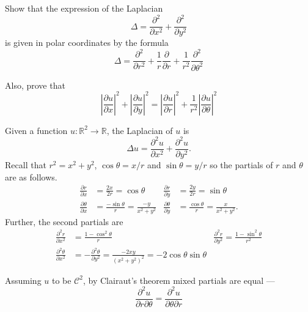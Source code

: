 \documentclass[12 pt, letterpaper]{hmcpset}
\begin{document}
\begin{problem}[S \& S \S 1.4 \#10.]
	Show that the expression of the Laplacian
	\[
		\Delta = \frac{\partial^{2}}{\partial x^{2}} + \frac{\partial^{2}}{\partial y^{2}}
	\]
	is given in polar coordinates by the formula
	\[
		\Delta = \frac{\partial^{2}}{\partial r^{2}} + \frac{1}{r} \frac{\partial }{\partial r} + \frac{1}{r^{2}} \frac{\partial^{2}}{\partial \theta^{2}}
	\]

	Also, prove that
	\[
		\left \lvert \frac{\partial u}{\partial x} \right \rvert^{2} + \left \lvert \frac{\partial u}{\partial y} \right \rvert^{2} = \left \lvert \frac{\partial u}{\partial r} \right \rvert^{2} + \frac{1}{r^{2}} \left \lvert \frac{\partial u}{\partial \theta} \right \rvert^{2}
	\]
\end{problem}

\begin{solution}
	Given a function $u : \mathbb{R}^{2} \to \mathbb{R}$, the Laplacian of $u$ is
	\[
		\Delta u = \frac{\partial^{2} u}{\partial x^{2}} + \frac{\partial^{2} u}{\partial y^{2}}.
	\]
	Recall that $r^{2} = x^{2} + y^{2}$, $\cos{\theta} = x / r$ and $\sin{\theta} = y / r$ so the partials of $r$ and $\theta$ are as follows.
	\begin{align*}
		\frac{\partial r}{\partial x} & = \frac{2x}{2r} = \cos{\theta} & \frac{\partial r}{\partial y} & = \frac{2y}{2r} = \sin{\theta} \\
		\frac{\partial \theta}{\partial x} & = \frac{-\sin{\theta}}{r} = \frac{-y}{x^{2} + y^{2}} & \frac{\partial \theta}{\partial y} & = \frac{\cos{\theta}}{r} = \frac{x}{x^{2} + y^{2}}.
	\end{align*}
	Further, the second partials are
	\begin{align*}
		\frac{\partial^{2} r}{\partial x^{2}} & = \frac{1 - \cos^{2}{\theta}}{r} & \frac{\partial^{2} r}{\partial y^{2}} = \frac{1 - \sin^{2}{\theta}}{r^{2}} \\
		\frac{\partial^{2} \theta}{\partial x^{2}} & = - \frac{\partial^{2} \theta}{\partial y^{2}} = \frac{-2 x y}{(x^{2} + y^{2})^{2}} = -2 \cos{\theta} \sin{\theta}
	\end{align*}

	Assuming $u$ to be $\mathcal{C}^{2}$, by Clairaut's theorem mixed partials are equal ---
	\[
		\frac{\partial^{2} u}{\partial r \partial \theta} = \frac{\partial^{2} u}{\partial \theta \partial r}
	\]


\end{solution}
\end{document}
